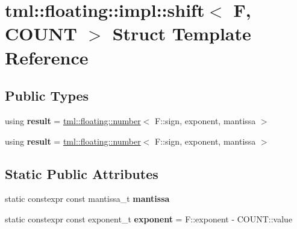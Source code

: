 \hypertarget{structtml_1_1floating_1_1impl_1_1shift}{\section{tml\+:\+:floating\+:\+:impl\+:\+:shift$<$ F, C\+O\+U\+N\+T $>$ Struct Template Reference}
\label{structtml_1_1floating_1_1impl_1_1shift}
}
\subsection*{Public Types}
\begin{DoxyCompactItemize}
\item 
\hypertarget{structtml_1_1floating_1_1impl_1_1shift_a4e2857fca646a13ba68bca641fefaacd}{using {\bfseries result} = \hyperlink{structtml_1_1floating_1_1number}{tml\+::floating\+::number}$<$ F\+::sign, exponent, mantissa $>$}\label{structtml_1_1floating_1_1impl_1_1shift_a4e2857fca646a13ba68bca641fefaacd}

\item 
\hypertarget{structtml_1_1floating_1_1impl_1_1shift_a4e2857fca646a13ba68bca641fefaacd}{using {\bfseries result} = \hyperlink{structtml_1_1floating_1_1number}{tml\+::floating\+::number}$<$ F\+::sign, exponent, mantissa $>$}\label{structtml_1_1floating_1_1impl_1_1shift_a4e2857fca646a13ba68bca641fefaacd}

\end{DoxyCompactItemize}
\subsection*{Static Public Attributes}
\begin{DoxyCompactItemize}
\item 
static constexpr const mantissa\+\_\+t {\bfseries mantissa}
\item 
\hypertarget{structtml_1_1floating_1_1impl_1_1shift_aabf6006f5836edde9d0cc5d4afd62096}{static constexpr const exponent\+\_\+t {\bfseries exponent} = F\+::exponent -\/ C\+O\+U\+N\+T\+::value}\label{structtml_1_1floating_1_1impl_1_1shift_aabf6006f5836edde9d0cc5d4afd62096}

\end{DoxyCompactItemize}


